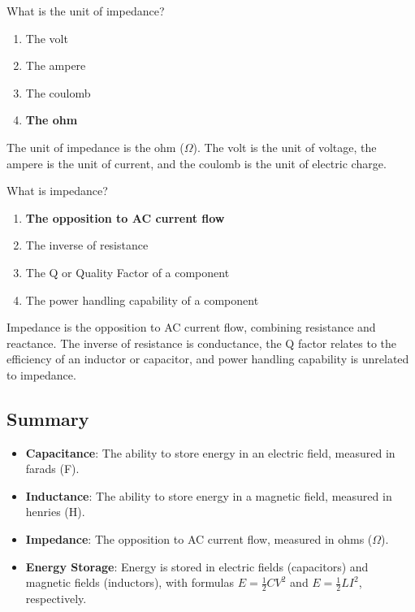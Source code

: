 
\begin{tcolorbox}[colback=gray!10!white,colframe=black!75!black,title={T5C05}]
    What is the unit of impedance?
    \begin{enumerate}[label=\Alph*,noitemsep]
        \item The volt
        \item The ampere
        \item The coulomb
        \item \textbf{The ohm}
    \end{enumerate}
\end{tcolorbox}
The unit of impedance is the ohm (\(\Omega\)). The volt is the unit of voltage, the ampere is the unit of current, and the coulomb is the unit of electric charge.


\begin{tcolorbox}[colback=gray!10!white,colframe=black!75!black,title={T5C12}]
    What is impedance?
    \begin{enumerate}[label=\Alph*,noitemsep]
        \item \textbf{The opposition to AC current flow}
        \item The inverse of resistance
        \item The Q or Quality Factor of a component
        \item The power handling capability of a component
    \end{enumerate}
\end{tcolorbox}
Impedance is the opposition to AC current flow, combining resistance and reactance. The inverse of resistance is conductance, the Q factor relates to the efficiency of an inductor or capacitor, and power handling capability is unrelated to impedance.


\subsection*{Summary}
\begin{itemize}
    \item \textbf{Capacitance}: The ability to store energy in an electric field, measured in farads (F).
    \item \textbf{Inductance}: The ability to store energy in a magnetic field, measured in henries (H).
    \item \textbf{Impedance}: The opposition to AC current flow, measured in ohms (\(\Omega\)).
    \item \textbf{Energy Storage}: Energy is stored in electric fields (capacitors) and magnetic fields (inductors), with formulas \( E = \frac{1}{2}CV^2 \) and \( E = \frac{1}{2}LI^2 \), respectively.
\end{itemize}
